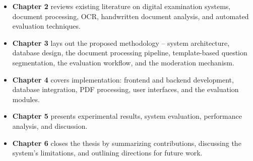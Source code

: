 \begin{itemize}

\item \textbf{Chapter 2} reviews existing literature on digital examination systems, document processing, OCR, handwritten document analysis, and automated evaluation techniques.

\item \textbf{Chapter 3} lays out the proposed methodology -- system architecture, database design, the document processing pipeline, template-based question segmentation, the evaluation workflow, and the moderation mechanism.

\item \textbf{Chapter 4} covers implementation: frontend and backend development, database integration, PDF processing, user interfaces, and the evaluation modules.

\item \textbf{Chapter 5} presents experimental results, system evaluation, performance analysis, and discussion.

\item \textbf{Chapter 6} closes the thesis by summarizing contributions, discussing the system's limitations, and outlining directions for future work.

\end{itemize}
